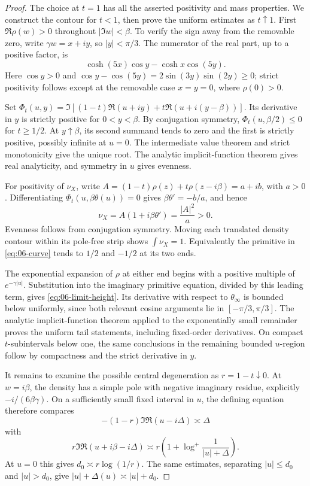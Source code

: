 \begin{proof}
The choice at \(t=1\) has all the asserted positivity and mass properties.
We construct the contour for \(t<1\), then prove the uniform estimates
as \(t\uparrow1\).
First \(\Re\rho(w)>0\) throughout \(|\Im w|<\beta\).
To verify the sign away from the removable zero, write
\(\gamma w=x+iy\), so \(|y|<\pi/3\).
The numerator of the real part, up to a positive factor, is
\[
 \cosh(5x)\cos y-\cosh x\cos(5y).
\]
Here \(\cos y>0\) and
\(\cos y-\cos(5y)=2\sin(3y)\sin(2y)\ge0\);
strict positivity follows except at the removable case \(x=y=0\),
where \(\rho(0)>0\).

Set
\(\Phi_t(u,y)=\Im[(1-t)\mathfrak R(u+iy)
 +t\mathfrak R(u+i(y-\beta))]\).
Its derivative in \(y\) is strictly positive for \(0<y<\beta\).
By conjugation symmetry,
\(\Phi_t(u,\beta/2)\le0\) for \(t\ge1/2\).
At \(y\uparrow\beta\), its second summand tends to zero and the
first is strictly positive, possibly infinite at \(u=0\).
The intermediate value theorem and strict monotonicity give the
unique root.  The analytic implicit-function theorem gives
real analyticity, and symmetry in \(u\) gives evenness.

For positivity of \(\nu_X\), write
\(A=(1-t)\rho(z)+t\rho(z-i\beta)=a+ib\), with \(a>0\).
Differentiating \(\Phi_t(u,\beta\theta(u))=0\) gives
\(\beta\theta'=-b/a\), and hence
\[
 \nu_X=A(1+i\beta\theta')=\frac{|A|^2}{a}>0.
\]
Evenness follows from conjugation symmetry.
Moving each translated density contour within its pole-free strip
shows \(\int\nu_X=1\).  Equivalently the primitive in
\eqref{eq:06-curve} tends to \(1/2\) and \(-1/2\) at its two ends.

The exponential expansion of \(\rho\) at either end begins with a
positive multiple of \(e^{-\gamma|u|}\).
Substitution into the imaginary primitive equation, divided by
this leading term, gives \eqref{eq:06-limit-height}.
Its derivative with respect to \(\theta_\infty\) is bounded below
uniformly, since both relevant cosine arguments lie in
\([-\pi/3,\pi/3]\).  The analytic implicit-function theorem applied
to the exponentially small remainder proves the uniform tail
statements, including fixed-order derivatives.  On compact
\(t\)-subintervals below one, the same conclusions in the remaining
bounded \(u\)-region follow by compactness and the strict derivative
in \(y\).

It remains to examine the possible central degeneration as
\(r=1-t\downarrow0\).  At \(w=i\beta\), the density has a simple
pole with negative imaginary residue, explicitly
\(-i/(6\beta\gamma)\).
On a sufficiently small fixed interval in \(u\), the defining
equation therefore compares
\[
 -(1-r)\Im\mathfrak R(u-i\Delta)\asymp\Delta
\]
with
\[
 r\Im\mathfrak R(u+i\beta-i\Delta)
 \asymp r\left(1+\log^+\frac1{|u|+\Delta}\right).
\]
At \(u=0\) this gives \(d_0\asymp r\log(1/r)\).
The same estimates, separating \(|u|\le d_0\) and \(|u|>d_0\),
give \(|u|+\Delta(u)\asymp |u|+d_0\).


\end{proof}
